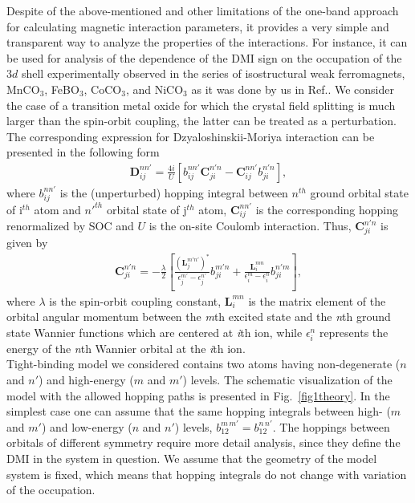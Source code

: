 \documentclass[aps,prl,twocolumn,showpacs,amsmath,amssymb]{revtex4-1}
\begin{document}
Despite of the above-mentioned and other limitations of the one-band approach for calculating magnetic interaction parameters, it provides a very simple and transparent way to analyze the properties of the interactions.  For instance, it can be used for analysis of the dependence of the DMI sign on the occupation of the $3d$ shell experimentally observed in the series of isostructural weak ferromagnets, MnCO$_3$, FeBO$_3$, CoCO$_3$, and NiCO$_3$ as it was done by us in Ref.\cite{carbonates}.
We consider the case of a transition metal oxide for which the crystal field splitting is much larger than the spin-orbit coupling, the latter can be treated as a perturbation. The corresponding expression for Dzyaloshinskii-Moriya interaction can be presented in the following form
\begin{eqnarray}
\mathbf{D}^{nn'}_{ij} = \frac{4i}{U} [b^{nn'}_{ij} \mathbf{C}^{n'n}_{ji} - \mathbf{C}^{nn'}_{ij}b^{n'n}_{ji}],
\end{eqnarray}
where $b^{nn'}_{ij}$ is the (unperturbed) hopping integral between $n^{th}$ ground orbital state of i$^{th}$ atom and $n'^{th}$ orbital state of j$^{th}$ atom, $\mathbf{C}^{nn'}_{ij}$ is the corresponding hopping renormalized by SOC and $U$ is the on-site Coulomb interaction.
Thus, $\mathbf{C}_{ji}^{n'n}$ is given by
\begin{eqnarray}
\mathbf{C}_{ji}^{n'n} = -\frac{\lambda}{2}[\frac{(\mathbf{L}^{m'n'}_{j})^*}{\epsilon_{j}^{m'}-\epsilon_{j}^{n'}}
b_{ji}^{m'n} +  \frac{\mathbf{L}^{mn}_{i}}{\epsilon_{i}^{m}-\epsilon_{i}^{n}}
b_{ji}^{n'm}],
\end{eqnarray}
where $\lambda$ is the spin-orbit coupling constant, $\mathbf{L}^{mn}_{i}$ is the matrix element of the orbital angular momentum between
the {\it m}th excited state and the {\it n}th ground state Wannier functions which are centered at {\it i}th ion,
while $\epsilon^{n}_{i}$ represents the energy of the {\it n}th Wannier orbital at the {\it i}th ion. \\

Tight-binding model we considered contains two atoms having non-degenerate ($n$ and $n'$) and high-energy ($m$ and $m'$) levels.
The schematic visualization of the model with the allowed hopping paths is presented in Fig.~\ref{fig1theory}.
In the simplest case one can assume that the same hopping integrals between high- ($m$ and $m'$) and low-energy ($n$ and $n'$) levels, $b_{12}^{m \, m'} = b_{12}^{n \, n'}$.
The hoppings between orbitals of different symmetry require more detail analysis, since they define the DMI in the system in question.
We assume that  the geometry of the model system is fixed, which means that hopping integrals do not change with variation of the occupation.
\end{document}
